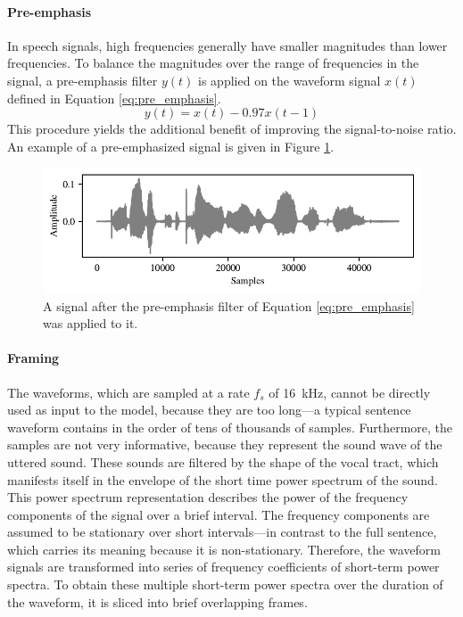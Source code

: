 		\paragraph{Pre-emphasis}

			In speech signals, high frequencies generally have smaller magnitudes than lower frequencies.
			To balance the magnitudes over the range of frequencies in the signal, a pre-emphasis filter $y(t)$ is applied on the waveform signal $x(t)$ defined in Equation \ref{eq:pre_emphasis}.
			\begin{equation}\label{eq:pre_emphasis}
				y(t) = x(t) - 0.97x(t-1)
			\end{equation}
			This procedure yields the additional benefit of improving the signal-to-noise ratio.
			An example of a pre-emphasized signal is given in Figure \ref{fig:signalemph}.
			\begin{figure}[ht]
				\centering
			    \includegraphics[width=\linewidth]{gfx/signalemph}
			    \caption[Pre-emphasis]{A signal after the pre-emphasis filter of Equation \ref{eq:pre_emphasis} was applied to it.}
			    \label{fig:signalemph}
			\end{figure}

		\paragraph{Framing}
			The waveforms, which are sampled at a rate $f_s$ of \SI{16}{\kHz}, cannot be directly used as input to the model, because they are too long---a typical sentence waveform contains in the order of tens of thousands of samples.
			Furthermore, the samples are not very informative, because they represent the sound wave of the uttered sound.
			These sounds are filtered by the shape of the vocal tract, which manifests itself in the envelope of the short time power spectrum of the sound.
			This power spectrum representation describes the power of the frequency components of the signal over a brief interval.
			The frequency components are assumed to be stationary over short intervals---in contrast to the full sentence, which carries its meaning because it is non-stationary.
			Therefore, the waveform signals are transformed into series of frequency coefficients of short-term power spectra.
			To obtain these multiple short-term power spectra over the duration of the waveform, it is sliced into brief overlapping frames.

